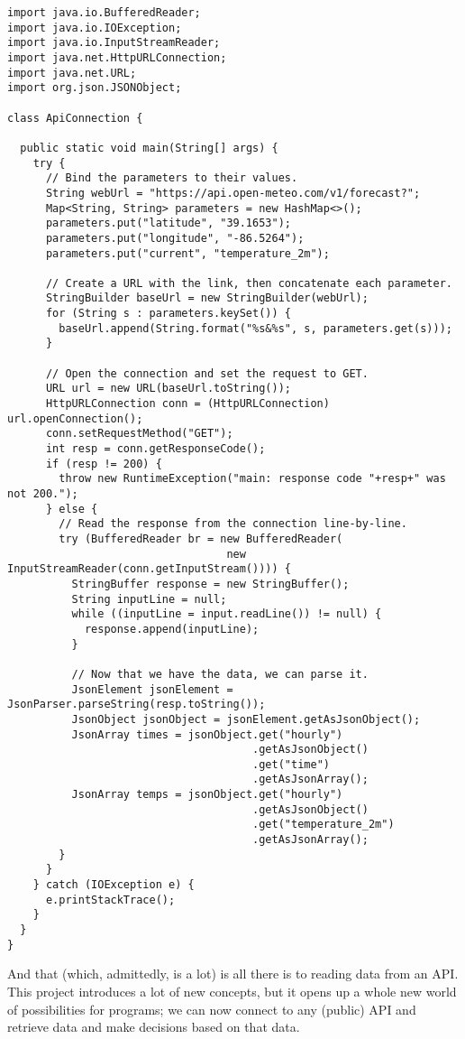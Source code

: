 \begin{lstlisting}[language=MyJava]
import java.io.BufferedReader;
import java.io.IOException;
import java.io.InputStreamReader;
import java.net.HttpURLConnection;
import java.net.URL;
import org.json.JSONObject;

class ApiConnection {

  public static void main(String[] args) {
    try {
      // Bind the parameters to their values.
      String webUrl = "https://api.open-meteo.com/v1/forecast?";
      Map<String, String> parameters = new HashMap<>();
      parameters.put("latitude", "39.1653");
      parameters.put("longitude", "-86.5264");
      parameters.put("current", "temperature_2m");

      // Create a URL with the link, then concatenate each parameter.
      StringBuilder baseUrl = new StringBuilder(webUrl);
      for (String s : parameters.keySet()) { 
        baseUrl.append(String.format("%s&%s", s, parameters.get(s))); 
      }
    
      // Open the connection and set the request to GET.
      URL url = new URL(baseUrl.toString());
      HttpURLConnection conn = (HttpURLConnection) url.openConnection();
      conn.setRequestMethod("GET");
      int resp = conn.getResponseCode();
      if (resp != 200) {
        throw new RuntimeException("main: response code "+resp+" was not 200.");
      } else {
        // Read the response from the connection line-by-line.
        try (BufferedReader br = new BufferedReader(
                                  new InputStreamReader(conn.getInputStream()))) {
          StringBuffer response = new StringBuffer();
          String inputLine = null;
          while ((inputLine = input.readLine()) != null) {
            response.append(inputLine); 
          }

          // Now that we have the data, we can parse it.
          JsonElement jsonElement = JsonParser.parseString(resp.toString());
          JsonObject jsonObject = jsonElement.getAsJsonObject();
          JsonArray times = jsonObject.get("hourly")
                                      .getAsJsonObject()
                                      .get("time")
                                      .getAsJsonArray();
          JsonArray temps = jsonObject.get("hourly")
                                      .getAsJsonObject()
                                      .get("temperature_2m")
                                      .getAsJsonArray();
        }
      }
    } catch (IOException e) {
      e.printStackTrace();
    }
  }
}
\end{lstlisting}

And that (which, admittedly, is a lot) is all there is to reading data from an API. This project introduces a lot of new concepts, but it opens up a whole new world of possibilities for programs; we can now connect to any (public) API and retrieve data and make decisions based on that data.